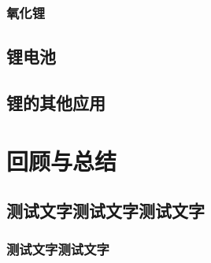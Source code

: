 \documentclass[color=orange]{textbook-cn}%
\begin{document}
\subsubsection{氧化锂}
\lipsum[1-2]
\subsection{锂电池}
\lipsum[1-2]
\subsection{锂的其他应用}
\lipsum[1-2]

\begin{Exercise}
\begin{QsNum}
\item \lipsum[1][1-2]
\item \lipsum[1][1-2]
\item \lipsum[1][1-2]
\item \lipsum[1][1-2]
\item \lipsum[1][1-2]
\item \lipsum[1][1-2]
\item \lipsum[1][1-2]
\item \lipsum[1][1-2]
\end{QsNum}
\tcblower
\lipsum[1]
\end{Exercise}


\section{回顾与总结}

\begin{Point*}
\lipsum[2]
\end{Point*}

\begin{Case*}
\item \lipsum[1][1]
\item \lipsum[1][1]
\item \lipsum[1][1]
\end{Case*}


\subsection{测试文字测试文字测试文字}


\subsubsection*{测试文字测试文字}
\lipsum[1-2]
\end{document}

